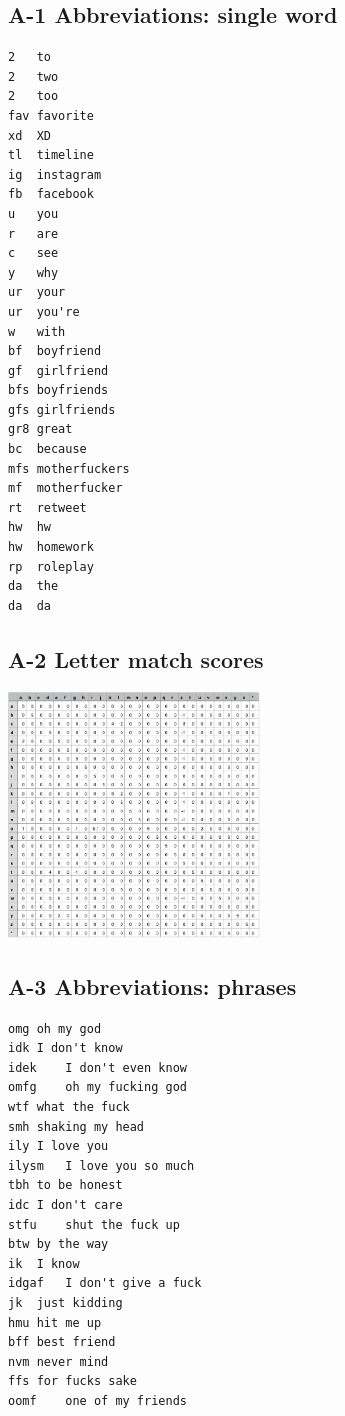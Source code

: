 \documentclass[twocolumn,10pt]{article}
\begin{document}
\subsection*{A-1 Abbreviations: single word}
\begin{verbatim}
2	to
2	two
2	too
fav	favorite
xd	XD
tl	timeline
ig	instagram
fb	facebook
u	you
r	are
c	see
y	why
ur	your
ur	you're
w	with
bf	boyfriend
gf	girlfriend
bfs	boyfriends
gfs	girlfriends
gr8	great
bc	because
mfs	motherfuckers
mf	motherfucker
rt	retweet
hw	hw
hw	homework
rp	roleplay
da	the
da	da
\end{verbatim}
\subsection*{A-2 Letter match scores}
\includegraphics[width=0.5\textwidth]{viterbi_matrix.png}
\subsection*{A-3 Abbreviations: phrases}
\begin{verbatim}
omg	oh my god
idk	I don't know
idek	I don't even know
omfg	oh my fucking god
wtf	what the fuck
smh	shaking my head
ily	I love you
ilysm	I love you so much
tbh	to be honest
idc	I don't care
stfu	shut the fuck up
btw	by the way
ik	I know
idgaf	I don't give a fuck
jk	just kidding
hmu	hit me up
bff	best friend
nvm	never mind
ffs	for fucks sake
oomf	one of my friends
\end{verbatim}
\end{document}
